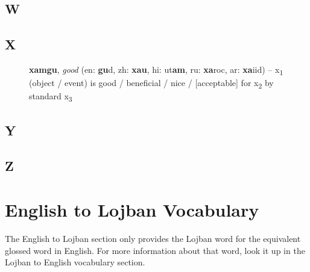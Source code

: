 \documentclass[12pt]{book}
\begin{document}
\subsection{W} %

\begin{description}
\item[ ]
\end{description}

\subsection{X} %

\begin{description}
\item[ ] \textbf{xamgu}, \textit{good} (en: \textbf{gu}d, zh: \textbf{xau}, hi: ut\textbf{am}, ru: \textbf{xa}roc, ar: \textbf{xa}iid) -- x\textsubscript{1} (object / event) is good / beneficial / nice / [acceptable] for x\textsubscript{2} by standard x\textsubscript{3}
\end{description}

\subsection{Y} %

\begin{description}
\item[ ]
\end{description}

\subsection{Z} %

\begin{description}
\item[ ]
\end{description}



\section{English to Lojban Vocabulary}

The English to Lojban section only provides the Lojban word for the equivalent glossed word in English. For more information about that word, look it up in the Lojban to English vocabulary section.
\end{document}

